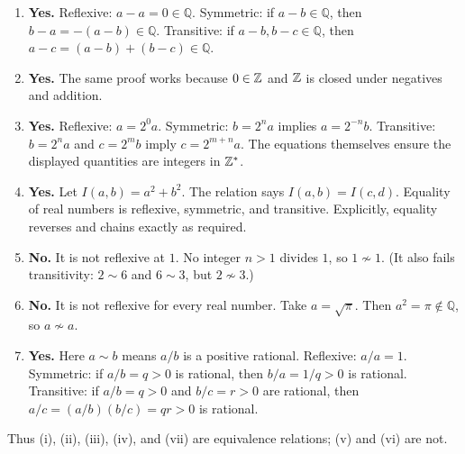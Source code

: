\documentclass[11pt,openany]{book}
\newcommand{\Q}{\mathbb Q}\newcommand{\R}{\mathbb R}
\begin{document}
\begin{solutionbox}
\begin{enumerate}[label=(\roman*)]
\item \textbf{Yes.} Reflexive: $a-a=0\in\Q$. Symmetric: if $a-b\in\Q$, then $b-a=-(a-b)\in\Q$. Transitive: if $a-b,b-c\in\Q$, then $a-c=(a-b)+(b-c)\in\Q$.

\item \textbf{Yes.} The same proof works because $0\in\mathbb Z$ and $\mathbb Z$ is closed under negatives and addition.

\item \textbf{Yes.} Reflexive: $a=2^0a$. Symmetric: $b=2^na$ implies $a=2^{-n}b$. Transitive: $b=2^na$ and $c=2^mb$ imply $c=2^{m+n}a$. The equations themselves ensure the displayed quantities are integers in $\mathbb Z^*$.

\item \textbf{Yes.} Let $I(a,b)=a^2+b^2$. The relation says $I(a,b)=I(c,d)$. Equality of real numbers is reflexive, symmetric, and transitive. Explicitly, equality reverses and chains exactly as required.

\item \textbf{No.} It is not reflexive at $1$. No integer $n>1$ divides $1$, so $1\not\sim1$. (It also fails transitivity: $2\sim6$ and $6\sim3$, but $2\not\sim3$.)

\item \textbf{No.} It is not reflexive for every real number. Take $a=\sqrt{\pi}$. Then $a^2=\pi\notin\Q$, so $a\not\sim a$.

\item \textbf{Yes.} Here $a\sim b$ means $a/b$ is a positive rational. Reflexive: $a/a=1$. Symmetric: if $a/b=q>0$ is rational, then $b/a=1/q>0$ is rational. Transitive: if $a/b=q>0$ and $b/c=r>0$ are rational, then $a/c=(a/b)(b/c)=qr>0$ is rational.
\end{enumerate}
Thus (i), (ii), (iii), (iv), and (vii) are equivalence relations; (v) and (vi) are not.
\end{solutionbox}
\end{document}

